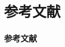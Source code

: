 \section{参考文献}

\begin{frame}[allowframebreaks]
    \frametitle{参考文献}
    \printbibliography
\end{frame}


